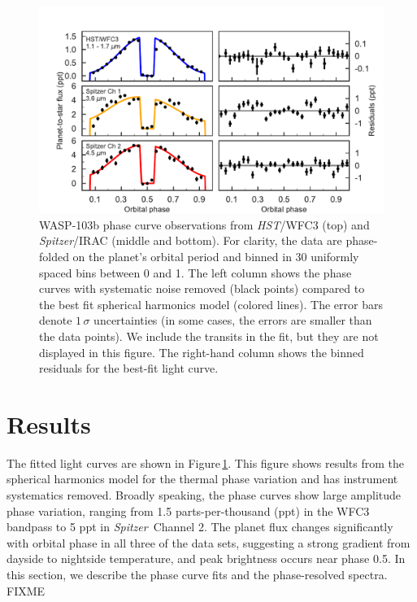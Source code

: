\documentclass[twocolumn]{aastex61}
\newcommand{\project}[1]{\textsl{#1}}
\newcommand{\HST}{\project{HST}}
\newcommand{\Spitzer}{\project{Spitzer}}
\begin{document}
\begin{figure}
\includegraphics[width = 1.0\textwidth]{Figures/phase_curves_spherical.pdf}
\caption{WASP-103b phase curve observations from \HST/WFC3 (top) and \Spitzer/IRAC (middle and bottom). For clarity, the data are phase-folded on the planet's orbital period and binned in 30 uniformly spaced bins between 0 and 1. The left column shows the phase curves with systematic noise removed (black points) compared to the best fit spherical harmonics model (colored lines). The error bars denote $1\,\sigma$ uncertainties (in some cases, the errors are smaller than the data points).
We include the transits in the fit, but they are not displayed in this figure. The right-hand column shows the binned residuals for the best-fit light curve.}
\label{fig:phasecurves}
\end{figure}

\section{Results}
\label{sec:results}
The fitted light curves are shown in Figure\,\ref{fig:phasecurves}. This figure shows results from the spherical harmonics model for the thermal phase variation and has instrument systematics removed.  Broadly speaking, the phase curves show large amplitude phase variation, ranging from 1.5 parts-per-thousand (ppt) in the WFC3 bandpass to 5 ppt in \Spitzer\ Channel 2.  The planet flux changes significantly with orbital phase in all three of the data sets, suggesting a strong gradient from dayside to nightside temperature, and peak brightness occurs near phase 0.5. In this section, we describe the phase curve fits and the phase-resolved spectra. FIXME 
\end{document}
